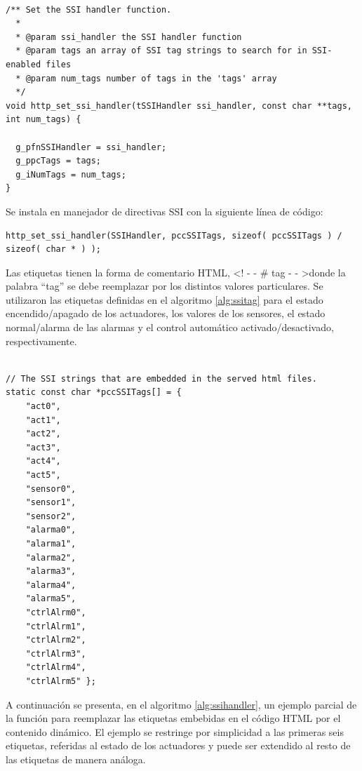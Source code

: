 %


\begin{lstlisting}[caption={Inicialización del SSI handler}, morecomment={[s]{/*}{*/}}, label={alg:ssiHandler}]  % Start your code-block

/** Set the SSI handler function.
  *
  * @param ssi_handler the SSI handler function
  * @param tags an array of SSI tag strings to search for in SSI-enabled files
  * @param num_tags number of tags in the 'tags' array
  */
void http_set_ssi_handler(tSSIHandler ssi_handler, const char **tags, int num_tags) {

  g_pfnSSIHandler = ssi_handler;
  g_ppcTags = tags;
  g_iNumTags = num_tags;
}
\end{lstlisting}

Se instala en manejador de directivas SSI con la siguiente línea de código:

\begin{lstlisting}
http_set_ssi_handler(SSIHandler, pccSSITags, sizeof( pccSSITags ) / sizeof( char * ) );
\end{lstlisting}

\vspace{-15px}
Las etiquetas tienen la forma de comentario HTML,	\textless ! \-- \-- \# tag \-- \-- \textgreater  donde la palabra ``tag'' se debe reemplazar por los distintos valores particulares. Se utilizaron las etiquetas definidas en el algoritmo \ref{alg:ssitag} para el estado encendido/apagado de los actuadores, los valores de los sensores, el estado normal/alarma de las alarmas y el control automático activado/desactivado, respectivamente.

\begin{lstlisting}[caption={Definición de etiquetas SSI}, label={alg:ssitag}]  % Start your code-block

// The SSI strings that are embedded in the served html files.
static const char *pccSSITags[] = {
	"act0",
	"act1",
	"act2",
	"act3",
	"act4",
	"act5",
	"sensor0",
	"sensor1",
	"sensor2",
	"alarma0",
	"alarma1",
	"alarma2",
	"alarma3",
	"alarma4",
	"alarma5",
	"ctrlAlrm0",
	"ctrlAlrm1",
	"ctrlAlrm2",
	"ctrlAlrm3",
	"ctrlAlrm4",
	"ctrlAlrm5" };
\end{lstlisting}

A continuación se presenta, en el algoritmo \ref{alg:ssihandler}, un ejemplo parcial de la función para reemplazar las etiquetas embebidas en el código HTML por el contenido dinámico.  El ejemplo se restringe por simplicidad a las primeras seis etiquetas, referidas al estado de los actuadores y puede ser extendido al resto de las etiquetas de manera análoga. 

